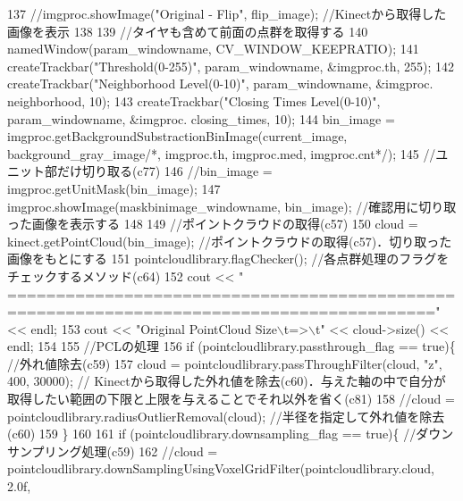 \begin{DoxyCode}
137             \textcolor{comment}{//imgproc.showImage("Original - Flip", flip\_image); //Kinectから取得した画像を表示}
138             
139             \textcolor{comment}{//タイヤも含めて前面の点群を取得する}
140             namedWindow(param\_windowname, CV\_WINDOW\_KEEPRATIO);
141             createTrackbar(\textcolor{stringliteral}{"Threshold(0-255)"}, param\_windowname, &imgproc.th, 255);
142             createTrackbar(\textcolor{stringliteral}{"Neighborhood Level(0-10)"}, param\_windowname, &imgproc.
      neighborhood, 10);
143             createTrackbar(\textcolor{stringliteral}{"Closing Times Level(0-10)"}, param\_windowname, &imgproc.
      closing_times, 10);
144             bin\_image = imgproc.getBackgroundSubstractionBinImage(current\_image, background\_gray\_image\textcolor{comment}{/*,
       imgproc.th, imgproc.med, imgproc.cnt*/});
145             \textcolor{comment}{//ユニット部だけ切り取る(c77)}
146             \textcolor{comment}{//bin\_image = imgproc.getUnitMask(bin\_image);}
147             imgproc.showImage(maskbinimage\_windowname, bin\_image); \textcolor{comment}{//確認用に切り取った画像を表示する}
148             
149             \textcolor{comment}{//ポイントクラウドの取得(c57)}
150             cloud = kinect.getPointCloud(bin\_image); \textcolor{comment}{//ポイントクラウドの取得(c57)．切り取った画像をもとにする}
151             pointcloudlibrary.flagChecker(); \textcolor{comment}{//各点群処理のフラグをチェックするメソッド(c64)}
152             cout << \textcolor{stringliteral}{"
      =========================================================================================="} << endl;
153             cout << \textcolor{stringliteral}{"Original PointCloud Size\(\backslash\)t=>\(\backslash\)t"} << cloud->size() << endl;
154 
155             \textcolor{comment}{//PCLの処理}
156             \textcolor{keywordflow}{if} (pointcloudlibrary.passthrough\_flag == \textcolor{keyword}{true})\{  \textcolor{comment}{//外れ値除去(c59)}
157                 cloud = pointcloudlibrary.passThroughFilter(cloud, \textcolor{stringliteral}{"z"}, 400, 30000); \textcolor{comment}{//
      Kinectから取得した外れ値を除去(c60)．与えた軸の中で自分が取得したい範囲の下限と上限を与えることでそれ以外を省く(c81)}
158                 \textcolor{comment}{//cloud = pointcloudlibrary.radiusOutlierRemoval(cloud); //半径を指定して外れ値を除去(c60)}
159             \}
160 
161             \textcolor{keywordflow}{if} (pointcloudlibrary.downsampling\_flag == \textcolor{keyword}{true})\{   \textcolor{comment}{//ダウンサンプリング処理(c59)}
162                 \textcolor{comment}{//cloud = pointcloudlibrary.downSamplingUsingVoxelGridFilter(pointcloudlibrary.cloud, 2.0f,
}
\end{DoxyCode}
